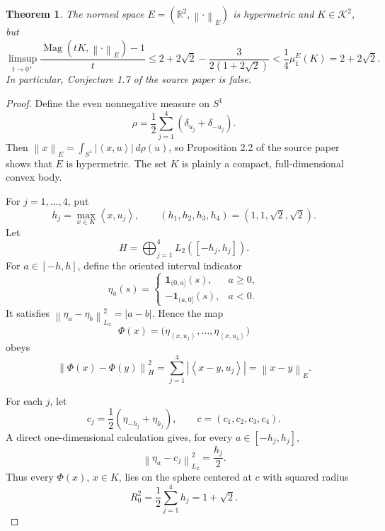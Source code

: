 \documentclass[11pt]{article}
\newtheorem{theorem}{Theorem}
\newcommand{\R}{\mathbb R}
\newcommand{\cK}{\mathcal K}
\newcommand{\Mag}{\operatorname{Mag}}
\newcommand{\ip}[2]{\left\langle #1,#2\right\rangle}
\newcommand{\norm}[1]{\left\lVert #1\right\rVert}
\begin{document}
\begin{theorem}\label{thm:counterexample}
The normed space \(E=(\R^2,\norm{\cdot}_E)\) is hypermetric and
\(K\in\cK^2\), but
\[
 \limsup_{t\to0^+}\frac{\Mag(tK,\norm{\cdot}_E)-1}{t}
 \le 2+2\sqrt2-\frac{3}{2(1+2\sqrt2)}
 <\frac14\mu_1^E(K)=2+2\sqrt2.
\]
In particular, Conjecture 1.7 of the source paper is false.
\end{theorem}

\begin{proof}
Define the even nonnegative measure on \(S^1\)
\[
 \rho=\frac12\sum_{j=1}^4(\delta_{u_j}+\delta_{-u_j}).
\]
Then
\(\norm{x}_E=\int_{S^1}|\ip{x}{u}|\,d\rho(u)\), so Proposition 2.2 of
the source paper shows that \(E\) is hypermetric. The set \(K\) is plainly a
compact, full-dimensional convex body.

For \(j=1,\dots,4\), put
\[
 h_j=\max_{x\in K}\ip{x}{u_j},
 \qquad (h_1,h_2,h_3,h_4)=(1,1,\sqrt2,\sqrt2).
\]
Let
\[
 H=\bigoplus_{j=1}^4 L_2([-h_j,h_j]).
\]
For \(a\in[-h,h]\), define the oriented interval indicator
\[
 \eta_a(s)=
 \begin{cases}
   \mathbf 1_{(0,a]}(s),&a\ge0,\\
   -\mathbf 1_{(a,0]}(s),&a<0.
 \end{cases}
\]
It satisfies
\(\norm{\eta_a-\eta_b}_{L_2}^2=|a-b|\). Hence the map
\[
 \Phi(x)=\bigl(\eta_{\ip{x}{u_1}},\ldots,
                   \eta_{\ip{x}{u_4}}\bigr)
\]
obeys
\begin{equation}\label{eq:embedding}
 \norm{\Phi(x)-\Phi(y)}_H^2
 =\sum_{j=1}^4|\ip{x-y}{u_j}|=\norm{x-y}_E.
\end{equation}

For each \(j\), let
\[
 c_j=\frac12(\eta_{-h_j}+\eta_{h_j}),\qquad c=(c_1,c_2,c_3,c_4).
\]
A direct one-dimensional calculation gives, for every
\(a\in[-h_j,h_j]\),
\[
 \norm{\eta_a-c_j}_{L_2}^2=\frac{h_j}{2}.
\]
Thus every \(\Phi(x)\), \(x\in K\), lies on the sphere centered at \(c\)
with squared radius
\begin{equation}\label{eq:R0}
 R_0^2=\frac12\sum_{j=1}^4h_j=1+\sqrt2.
\end{equation}


\end{proof}
\end{document}
